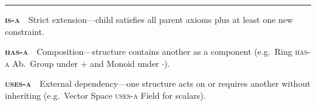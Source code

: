 \vspace{4pt}\hrule\vspace{4pt}

\noindent
\begin{minipage}[t]{0.32\textwidth}
  \scriptsize
  \textbf{\textsc{is-a}}\ \ Strict extension---child satisfies all
  parent axioms plus at least one new constraint.
\end{minipage}%
\hfill
\begin{minipage}[t]{0.32\textwidth}
  \scriptsize
  \textbf{\textsc{has-a}}\ \ Composition---structure contains another
  as a component (e.g.\ Ring \textsc{has-a} Ab.\ Group under $+$
  and Monoid under $\cdot$).
\end{minipage}%
\hfill
\begin{minipage}[t]{0.32\textwidth}
  \scriptsize
  \textbf{\textsc{uses-a}}\ \ External dependency---one structure
  acts on or requires another without inheriting (e.g.\ Vector
  Space \textsc{uses-a} Field for scalars).
\end{minipage}
\clearpage